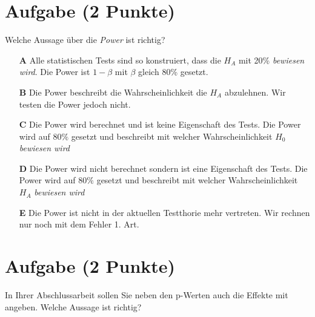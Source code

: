 \documentclass[a4paper, 9pt]{scrartcl}\usepackage[]{graphicx}\usepackage[]{xcolor}
\begin{document}
\section{Aufgabe \hfill (2 Punkte)}



Welche Aussage über die \textit{Power} ist richtig?



\begin{enumerate}
\item [\textbf{A} \msquare] Alle statistischen Tests sind so konstruiert, dass die $H_A$ mit 20\% \textit{bewiesen wird}. Die Power ist $1-\beta$ mit $\beta$ gleich 80\% gesetzt.
\item [\textbf{B} \msquare] Die Power beschreibt die Wahrscheinlichkeit die $H_A$ abzulehnen. Wir testen die Power jedoch nicht.
\item [\textbf{C} \msquare] Die Power wird berechnet und ist keine Eigenschaft des Tests. Die Power wird auf $80\%$ gesetzt und beschreibt mit welcher Wahrscheinlichkeit $H_0$ \textit{bewiesen wird}
\item [\textbf{D} \msquare] Die Power wird nicht berechnet sondern ist eine Eigenschaft des Tests. Die Power wird auf $80\%$ gesetzt und beschreibt mit welcher Wahrscheinlichkeit $H_A$ \textit{bewiesen wird}
\item [\textbf{E} \msquare] Die Power ist nicht in der aktuellen Testthorie mehr vertreten. Wir rechnen nur noch mit dem Fehler 1. Art.
\end{enumerate}

\section{Aufgabe \hfill (2 Punkte)}



In Ihrer Abschlussarbeit sollen Sie neben den p-Werten auch die Effekte mit angeben. Welche Aussage ist richtig?
\end{document}

